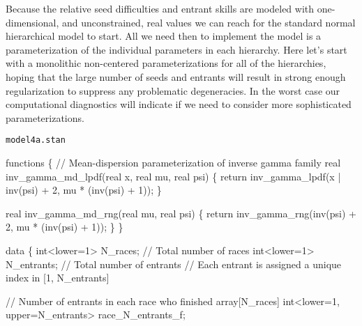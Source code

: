 \documentclass[
  letterpaper,
  DIV=11,
  numbers=noendperiod]{scrartcl}
\newenvironment{Shaded}{\begin{snugshade}}{\end{snugshade}}
\newcommand{\CommentTok}[1]{\textcolor[rgb]{0.37,0.37,0.37}{#1}}
\newcommand{\ControlFlowTok}[1]{\textcolor[rgb]{0.00,0.23,0.31}{#1}}
\newcommand{\DataTypeTok}[1]{\textcolor[rgb]{0.68,0.00,0.00}{#1}}
\newcommand{\DecValTok}[1]{\textcolor[rgb]{0.68,0.00,0.00}{#1}}
\newcommand{\KeywordTok}[1]{\textcolor[rgb]{0.00,0.23,0.31}{#1}}
\newcommand{\NormalTok}[1]{\textcolor[rgb]{0.00,0.23,0.31}{#1}}
\begin{document}
Because the relative seed difficulties and entrant skills are modeled
with one-dimensional, and unconstrained, real values we can reach for
the standard normal hierarchical model to start. All we need then to
implement the model is a parameterization of the individual parameters
in each hierarchy. Here let's start with a monolithic non-centered
parameterizations for all of the hierarchies, hoping that the large
number of seeds and entrants will result in strong enough regularization
to suppress any problematic degeneracies. In the worst case our
computational diagnostics will indicate if we need to consider more
sophisticated parameterizations.

\begin{codelisting}

\caption{\texttt{model4a.stan}}

\begin{Shaded}
\begin{Highlighting}[]
\KeywordTok{functions}\NormalTok{ \{}
  \CommentTok{// Mean{-}dispersion parameterization of inverse gamma family}
  \DataTypeTok{real}\NormalTok{ inv\_gamma\_md\_lpdf(}\DataTypeTok{real}\NormalTok{ x, }\DataTypeTok{real}\NormalTok{ mu, }\DataTypeTok{real}\NormalTok{ psi) \{}
    \ControlFlowTok{return}\NormalTok{ inv\_gamma\_lpdf(x | inv(psi) + }\DecValTok{2}\NormalTok{, mu * (inv(psi) + }\DecValTok{1}\NormalTok{));}
\NormalTok{  \}}

  \DataTypeTok{real}\NormalTok{ inv\_gamma\_md\_rng(}\DataTypeTok{real}\NormalTok{ mu, }\DataTypeTok{real}\NormalTok{ psi) \{}
    \ControlFlowTok{return}\NormalTok{ inv\_gamma\_rng(inv(psi) + }\DecValTok{2}\NormalTok{, mu * (inv(psi) + }\DecValTok{1}\NormalTok{));}
\NormalTok{  \}}
\NormalTok{\}}

\KeywordTok{data}\NormalTok{ \{}
  \DataTypeTok{int}\NormalTok{\textless{}}\KeywordTok{lower}\NormalTok{=}\DecValTok{1}\NormalTok{\textgreater{} N\_races;    }\CommentTok{// Total number of races}
  \DataTypeTok{int}\NormalTok{\textless{}}\KeywordTok{lower}\NormalTok{=}\DecValTok{1}\NormalTok{\textgreater{} N\_entrants; }\CommentTok{// Total number of entrants}
  \CommentTok{// Each entrant is assigned a unique index in [1, N\_entrants]}

  \CommentTok{// Number of entrants in each race who finished}
  \DataTypeTok{array}\NormalTok{[N\_races] }\DataTypeTok{int}\NormalTok{\textless{}}\KeywordTok{lower}\NormalTok{=}\DecValTok{1}\NormalTok{, }\KeywordTok{upper}\NormalTok{=N\_entrants\textgreater{} race\_N\_entrants\_f;}


\end{Highlighting}
\end{Shaded}
\end{codelisting}
\end{document}
